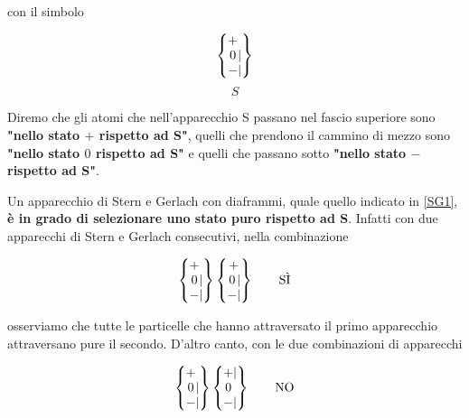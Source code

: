 \documentclass[a4paper,12pt,oneside]{book}
\begin{document}
con il simbolo
 
	\begin{equation}
		\begin{Bmatrix} \makebox[\widthof{$-$}]{$+$}\makebox[\widthof{$|$}]{$\ $} \\ \makebox[\widthof{$-$}]{$0$} | \\ -  |  
		\end{Bmatrix}
	\label{SG1}
	\end{equation}
	\begin{equation*}
		S
	\end{equation*}
 
Diremo che gli atomi che nell'apparecchio S passano nel fascio superiore sono \textbf{"nello stato $+$ rispetto ad S"}, quelli che prendono il cammino di mezzo sono \textbf{"nello stato $0$ rispetto ad S"} e quelli che passano sotto \textbf{"nello stato $-$ rispetto ad S"}.

Un apparecchio di Stern e Gerlach con diaframmi, quale quello indicato in \eqref{SG1}, \textbf{è in grado di selezionare uno stato puro rispetto ad S}. Infatti con due apparecchi di Stern e Gerlach consecutivi, nella combinazione

	\begin{equation}
		\begin{Bmatrix}
 			\makebox[\widthof{$-$}]{$+$}\makebox[\widthof{$|$}]{$\ $} \\ \makebox[\widthof{$-$}]{$0$} | \\ - |  
		\end{Bmatrix}
		\begin{Bmatrix}
			 \makebox[\widthof{$-$}]{$+$} \\ \makebox[\widthof{$-$}]{$0$} | \\ - |  
		\end{Bmatrix} \qquad \text{SÌ}
	\label{SG2}
	\end{equation}
 
osserviamo che tutte le particelle che hanno attraversato il primo apparecchio attraversano pure il secondo. D'altro canto, con le due combinazioni di apparecchi

	\begin{equation}
		\begin{Bmatrix}
			\makebox[\widthof{$-$}]{$+$}\makebox[\widthof{$|$}]{$\ $} \\ \makebox[\widthof{$-$}]{$0$} | \\ - |  
		\end{Bmatrix}
		\begin{Bmatrix}
 			\makebox[\widthof{$-$}]{$+$} |  \\ \makebox[\widthof{$-$}]{$0$}\makebox[\widthof{$|$}]{$\ $}  \\ - |  
		\end{Bmatrix} \qquad \text{NO}
	\label{SG3}
	\end{equation}
\end{document}

